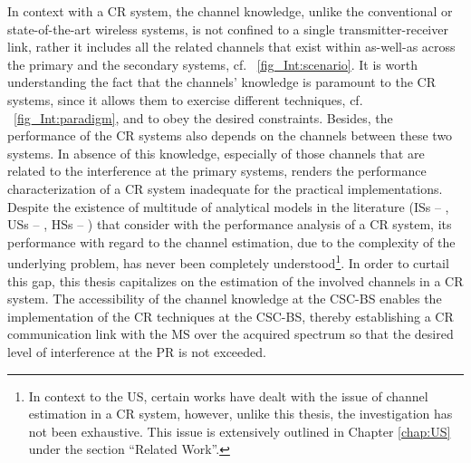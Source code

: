 In context with a CR system, the channel knowledge, unlike the conventional or state-of-the-art wireless systems, is not confined to a single transmitter-receiver link, rather it includes all the related channels that exist within as-well-as across the primary and the secondary systems, cf. \figurename~\ref{fig_Int:scenario}. It is worth understanding the fact that the channels' knowledge is paramount to the CR systems, since it allows them to exercise different techniques, cf. \figurename~\ref{fig_Int:paradigm}, and to obey the desired constraints. Besides, the performance of the CR systems also depends on the channels between these two systems. In absence of this knowledge, especially of those channels that are related to the interference at the primary systems, renders the performance characterization of a CR system inadequate for the practical implementations. Despite the existence of multitude of analytical models in the literature (ISs -- \cite{Liang08, Sharma14, Pradhan15}, USs -- \cite{Xing07, Ghasemi07, Kang09}, HSs -- \cite{Song13, Gmira15, Jiang13, Fili15}) that consider with the performance analysis of a CR system, its performance with regard to the channel estimation, due to the complexity of the underlying problem, has never been completely understood\footnote{In context to the US, certain works \cite{Musa09, Suraweera10, Kim12} have dealt with the issue of channel estimation in a CR system, however, unlike this thesis, the investigation has not been exhaustive. This issue is extensively outlined in Chapter \ref{chap:US} under the section ``Related Work''.}. In order to curtail this gap, this thesis capitalizes on the estimation of the involved channels in a CR system. The accessibility of the channel knowledge at the CSC-BS enables the implementation of the CR techniques at the CSC-BS, thereby establishing a CR communication link with the MS over the acquired spectrum so that the desired level of interference at the PR is not exceeded. 

